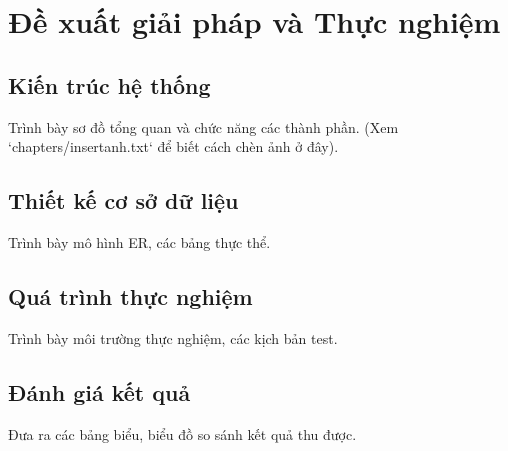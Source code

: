 
\chapter{Đề xuất giải pháp và Thực nghiệm}

\section{Kiến trúc hệ thống}
Trình bày sơ đồ tổng quan và chức năng các thành phần.
(Xem `chapters/insertanh.txt` để biết cách chèn ảnh ở đây).

\section{Thiết kế cơ sở dữ liệu}
Trình bày mô hình ER, các bảng thực thể.

\section{Quá trình thực nghiệm}
Trình bày môi trường thực nghiệm, các kịch bản test.

\section{Đánh giá kết quả}
Đưa ra các bảng biểu, biểu đồ so sánh kết quả thu được.
